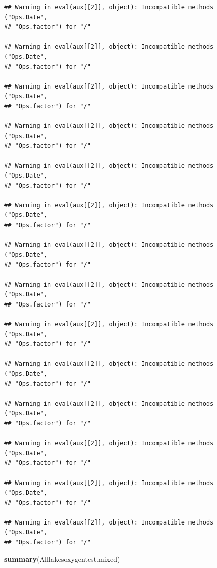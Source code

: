 \documentclass[12pt,]{article}
\newenvironment{Shaded}{\begin{snugshade}}{\end{snugshade}}
\newcommand{\KeywordTok}[1]{\textcolor[rgb]{0.13,0.29,0.53}{\textbf{#1}}}
\newcommand{\NormalTok}[1]{#1}
\begin{document}
\begin{verbatim}
## Warning in eval(aux[[2]], object): Incompatible methods ("Ops.Date",
## "Ops.factor") for "/"

## Warning in eval(aux[[2]], object): Incompatible methods ("Ops.Date",
## "Ops.factor") for "/"

## Warning in eval(aux[[2]], object): Incompatible methods ("Ops.Date",
## "Ops.factor") for "/"

## Warning in eval(aux[[2]], object): Incompatible methods ("Ops.Date",
## "Ops.factor") for "/"

## Warning in eval(aux[[2]], object): Incompatible methods ("Ops.Date",
## "Ops.factor") for "/"

## Warning in eval(aux[[2]], object): Incompatible methods ("Ops.Date",
## "Ops.factor") for "/"

## Warning in eval(aux[[2]], object): Incompatible methods ("Ops.Date",
## "Ops.factor") for "/"

## Warning in eval(aux[[2]], object): Incompatible methods ("Ops.Date",
## "Ops.factor") for "/"

## Warning in eval(aux[[2]], object): Incompatible methods ("Ops.Date",
## "Ops.factor") for "/"

## Warning in eval(aux[[2]], object): Incompatible methods ("Ops.Date",
## "Ops.factor") for "/"

## Warning in eval(aux[[2]], object): Incompatible methods ("Ops.Date",
## "Ops.factor") for "/"

## Warning in eval(aux[[2]], object): Incompatible methods ("Ops.Date",
## "Ops.factor") for "/"

## Warning in eval(aux[[2]], object): Incompatible methods ("Ops.Date",
## "Ops.factor") for "/"

## Warning in eval(aux[[2]], object): Incompatible methods ("Ops.Date",
## "Ops.factor") for "/"
\end{verbatim}

\begin{Shaded}
\begin{Highlighting}[]
\KeywordTok{summary}\NormalTok{(Alllakesoxygentest.mixed)}
\end{Highlighting}
\end{Shaded}
\end{document}
